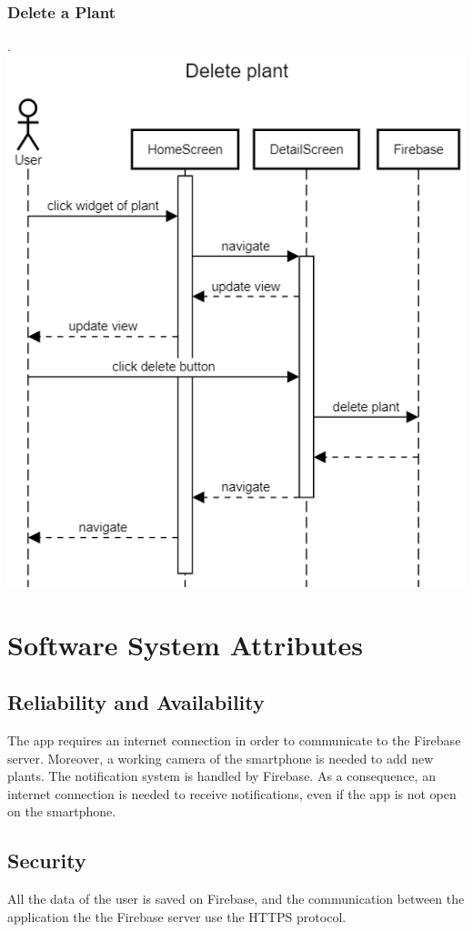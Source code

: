 \documentclass[10pt]{article}
\begin{document}
	\subsubsection{Delete a Plant}
	.
	\newline
	\newline
	\newline
	\includegraphics[scale=0.40]{resources/DeletePlant.png}
	
	\newpage
	\section{Software System Attributes}
	\subsection{Reliability and Availability}
	The app requires an internet connection in order to communicate to the Firebase server. Moreover, a working camera of the smartphone is needed to add new plants. The notification system is handled by Firebase. As a consequence, an internet connection is needed to receive notifications, even if the app is not open on the smartphone. 
	\subsection{Security}
	All the data of the user is saved on Firebase, and the communication between the application the the Firebase server use the HTTPS protocol.
\end{document}
